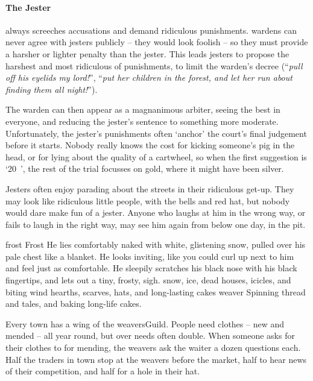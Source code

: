 \begin{multicols}{2}
\paragraph[the Jester]{The Jester}
\label{guildJester}%
always screeches accusations and demand ridiculous punishments.
\Glspl{warden} can never agree with jesters publicly -- they would look foolish -- so they must provide a harsher or lighter penalty than the jester.
This leads jesters to propose the harshest and most ridiculous of punishments, to limit the \gls{warden}'s decree (``\emph{pull off his eyelids my lord!}'', ``\emph{put her children in the forest, and let her run about finding them all night!}'').

The \gls{warden} can then appear as a magnanimous arbiter, seeing the best in everyone, and reducing the jester's sentence to something more moderate.
Unfortunately, the jester's punishments often `anchor' the court's final judgement before it starts.
Nobody really knows the cost for kicking someone's pig in the head, or for lying about the quality of a cartwheel, so when the first suggestion is `20~', the rest of the trial focusses on gold, where it might have been silver.

Jesters often enjoy parading about the streets in their ridiculous get-up.
They may look like ridiculous little people, with the bells and red hat, but nobody would dare make fun of a jester.
Anyone who laughs at him in the wrong way, or fails to laugh in the right way, may see him again from below one day, in the pit.

  {\gls{frost}}%
  {Frost}%
  {
    He lies comfortably naked with white, glistening snow, pulled over his pale chest like a blanket.
    He looks inviting, like you could curl up next to him and feel just as comfortable.
    He sleepily scratches his black nose with his black fingertips, and lets out a tiny, frosty, {\sffamily sigh}.
  }%
  {snow, ice, dead houses, icicles, and biting wind}%
  {hearths, scarves, hats, and long-lasting cakes}%
  {\Gls{weaver}}%
  {
    Spinning thread and tales, and baking long-life cakes.
  }%

Every town has a wing of the \gls{weaversGuild}.
People need clothes -- new and mended -- all year round, but over needs often double.
When someone asks for their clothes to for mending, the weavers ask the waiter a dozen questions each.
Half the traders in town stop at the weavers before the market, half to hear news of their competition, and half for a hole in their hat.


\end{multicols}
